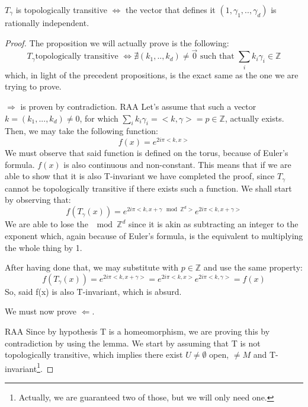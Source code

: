 \begin{proposition}
    $T_{\gamma}$ is topologically transitive $\iff$ the vector that defines it $(1,\gamma_1,..,\gamma_d)$ is rationally independent.
\end{proposition}

\begin{proof}
    The proposition we will actually prove is the following: \begin{equation*}
        T_{\gamma} \text{topologically transitive }\iff \nexists (k_1,..,k_d)\neq \vec{0}\text{ such that }\sum_{i}k_i\gamma_i\in\mathbb{Z}
    \end{equation*}
    which, in light of the precedent propositions, is the exact same as the one we are trying to prove. 

    $\Rightarrow$ is proven by contradiction. RAA Let's assume that such a vector $k=(k_1,...,k_d)\neq0$, for which $\sum_ik_i\gamma_i=<k,\gamma>=p\in\mathbb{Z}$, actually exists. Then, we may take the following function: \begin{equation*}
        f(x)=e^{2i\pi<k, x>}
    \end{equation*}
    We must observe that said function is defined on the torus, because of Euler's formula. $f(x)$ is also continuous and non-constant. This means that if we are able to show that it is also T-invariant we have completed the proof, since $T_{\gamma}$ cannot be topologically transitive if there exists such a function. We shall start by observing that:
    \begin{equation*}
        f(T_{\gamma}(x))=e^{2i\pi<k, x+\gamma \mod \mathbb{Z}^d>}e^{2i\pi<k, x+\gamma>}
    \end{equation*}
    We are able to lose the $\mod \mathbb{Z}^d$ since it is akin as subtracting an integer to the exponent which, again because of Euler's formula, is the equivalent to multiplying the whole thing by 1.

    After having done that, we may substitute with $p\in\mathbb{Z}$ and use the same property: \begin{equation*}
        f(T_{\gamma}(x))=e^{2i\pi<k, x+\gamma>}=e^{2i\pi<k, x>}e^{2i\pi<k, \gamma>}=f(x)
    \end{equation*}
    So, said f(x) is also T-invariant, which is absurd.

    We must now prove $\Leftarrow$.

    RAA Since by hypothesis T is a homeomorphism, we are proving this by contradiction by using the lemma. We start by assuming that T is not topologically transitive, which implies there exist $U\neq\emptyset$ open, $\neq M$ and T-invariant\footnote{Actually, we are guaranteed two of those, but we will only need one.}.
    

\end{proof}
